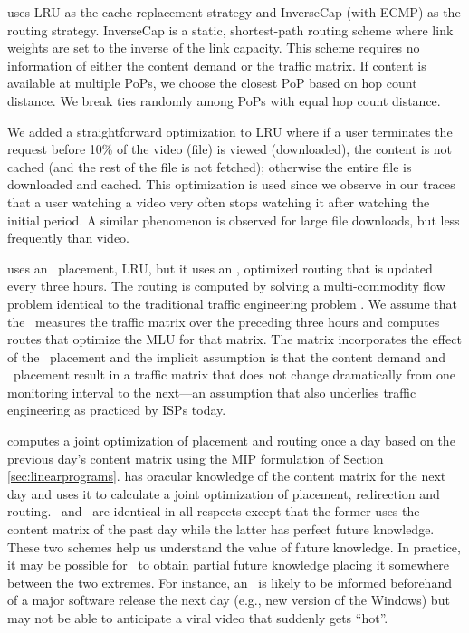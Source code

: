 \textbf{\invlru} uses LRU as the cache replacement strategy and InverseCap  (with ECMP) as the routing strategy. InverseCap is a static, shortest-path routing scheme where link weights are set to the inverse of the link capacity.  This scheme requires no information of either the content demand or the traffic matrix. If content is available at multiple PoPs, we choose the closest PoP based on hop count distance. We break  ties randomly among PoPs with equal hop count distance.
 
We added  a straightforward optimization to LRU where if a user terminates the request before 10\% of the video (file) is viewed (downloaded), the content is not cached (and the rest of the file is not fetched); otherwise the entire file is downloaded and cached. This optimization is used since we observe in our traces that a user watching a video very often stops watching it after watching the initial period. A similar phenomenon is observed for large file downloads, but less frequently than video.


 \textbf{\optlru} uses an \unplanned\  placement, LRU, but it uses an \planned, optimized routing that is updated  every three hours. The routing is computed by solving a multi-commodity flow problem 
 identical to  the traditional traffic engineering problem \cite{fortz2000internet}. We assume that the \ncp\ measures the traffic matrix over the preceding  three hours and computes routes that optimize the MLU for that matrix. The matrix incorporates the effect of the \unplanned\  placement and the implicit assumption is that the content demand and \unplanned\  placement result in a traffic matrix that does not change dramatically from one monitoring interval to the next---an assumption that also underlies traffic engineering as practiced by ISPs today. 
 


\textbf{\optrp} computes a joint optimization of placement and routing once a day based on the previous day's content matrix using the MIP formulation of Section \ref{sec:linearprograms}.  \textbf{\optrpfuture} has oracular knowledge of the content matrix for the next day and uses it to calculate a joint optimization of placement, redirection and routing.  \optrp\ and \optrpfuture\ are identical in all respects except that the former uses the content matrix of the past day while the latter has perfect future knowledge. These two schemes help us understand the value of future knowledge. In practice, it may be possible for \ancp\  to obtain partial future knowledge placing it somewhere between the two extremes. For instance, an \ncp\ is likely to be informed beforehand of a major software release the next day (e.g., new version of the Windows) but may not be able to anticipate a viral video that suddenly gets ``hot''.



